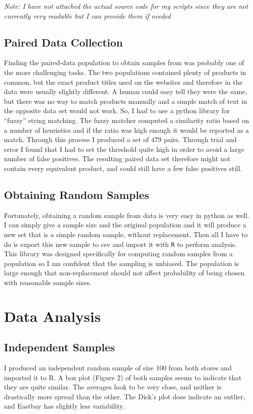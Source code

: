 \documentclass[12pt]{article}
\begin{document}
  \emph{Note: I have not attached the actual source code for my scripts since they are not currently very readable but I can provide them if needed}

 
 \subsection{Paired Data Collection}
 Finding the paired-data population to obtain samples from was probably one of the more challenging tasks. The two populations contained plenty of products in common, but the exact product titles used on the websites and therefore in the data were usually slightly different. A human could easy tell they were the same, but there was no way to match products manually
 and a simple match of text in the opposite data set would not work. So, I had to use a python library for ``fuzzy'' string matching. The fuzzy matcher computed a similarity ratio based on a 
 number of heuristics and if the ratio was high enough it would be reported as a match. Through this process I produced a set of $479$ pairs. Through trial and error I found that I had to set the threshold quite high in order to avoid a large number of false positives. The resulting paired data set therefore might not contain every equivalent product, and could still have a few false positives still.
 
 \subsection{Obtaining Random Samples}
 Fortunately, obtaining a random sample from data is very easy in python as well. I can simply give a sample size and the original population and it will produce a new set that is a simple
 random sample, without replacement. Then all I have to do is export this new sample to csv and import it with \texttt{R} to perform analysis. This library was designed specifically for computing random
 samples from a population so I am confident that the sampling is unbiased. The population is large enough that non-replacement should not affect probability of being chosen with reasonable sample sizes.

\section{Data Analysis}
\subsection{Independent Samples}
I produced an independent random sample of size $100$ from both stores and imported it to R. A box plot (Figure 2) of both samples seems to indicate that they are quite similar. The averages
look to be very close, and neither is drastically more spread than the other. The Dick's plot does indicate an outlier, and Eastbay has slightly less variability. 
\end{document}
